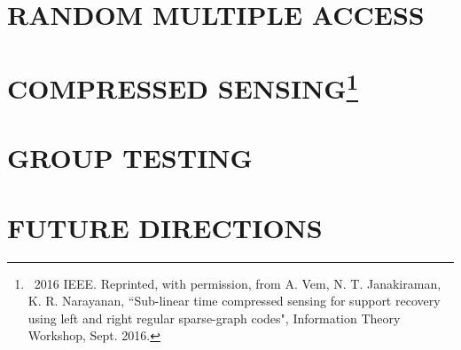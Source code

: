\documentclass[12pt]{report}
\begin{document}
\chapter{RANDOM MULTIPLE ACCESS}
\label{chap:uncoord_mac}



\chapter{COMPRESSED SENSING\footnote{\textcopyright ~2016 IEEE. Reprinted, with permission, from A. Vem, N. T. Janakiraman, K. R. Narayanan, ``Sub-linear time compressed sensing for support recovery using left and right regular sparse-graph codes", Information Theory Workshop, Sept. 2016.}}
\label{chap:cs}


\chapter{GROUP TESTING}
\label{chap:gt}


\chapter{\uppercase{ Future Directions}}
\label{chap:conclusion}


\let\oldbibitem\bibitem
\renewcommand{\bibitem}{\setlength{\itemsep}{0pt}\oldbibitem}

{}
\renewcommand{\bibname}{{\normalsize\rm REFERENCES}}



%
\end{document}
